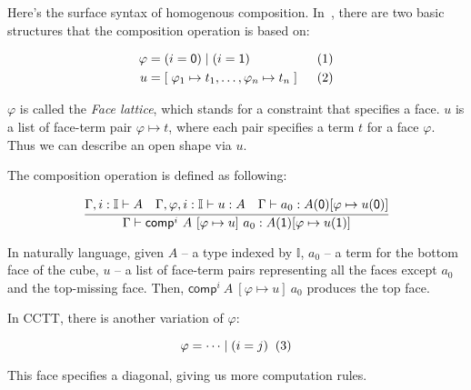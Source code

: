 Here's the surface syntax of homogenous composition.
In~\cite{CCHM}, there are two basic structures that the composition operation
is based on:

\begin{align*}
  \varphi &= (i=\textsf 0) \mid (i=\textsf 1)
  & \xtag \\
  u &= [ \; \varphi_1 \mapsto t_1,
      \dots, \varphi_n \mapsto t_n \; ]
  & \xtag
\end{align*}

$\varphi$ is called the \textit{Face lattice},
which stands for a constraint that specifies a face.
$u$ is a list of face-term pair $\varphi \mapsto t$,
where each pair specifies a term $t$ for a face $\varphi$.
Thus we can describe an open shape via $u$.

The composition operation is defined as following:

\newcommand{\comp}{\textsf{comp}}

\[
  \cfrac
  {\Gamma, i : \mathbb I \vdash A \quad
    \Gamma, \varphi, i : \mathbb I \vdash u : A \quad
    \Gamma \vdash a_0 : A(\textsf 0)[ \varphi \mapsto u(\textsf 0) ]}
  {\Gamma \vdash \comp^i~A~[ \varphi \mapsto u ]~a_0 :
    A(\textsf 1)[ \varphi \mapsto u(\textsf 1) ]}
\]

In naturally language, given
$A$ -- a type indexed by $\mathbb I$,
$a_0$ -- a term for the bottom face of the cube,
$u$ -- a list of face-term pairs representing all the faces except
$a_0$ and the top-missing face.
Then, $\comp^i~A~[ \varphi \mapsto u ]~a_0$ produces the top face.

In CCTT, there is another variation of $\varphi$:

\[
  \varphi = \dots \mid (i = j)
  \xtag
\]

This face specifies a diagonal,
giving us more computation rules.

